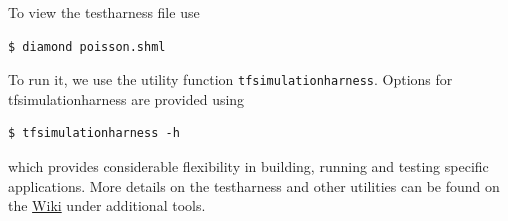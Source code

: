 To view the testharness file use
\begin{lstlisting}[style=Bash]
 $ diamond poisson.shml
\end{lstlisting} %
To run it, we use the utility function
\texttt{tfsimulationharness}.  Options for tfsimulationharness are
provided using 
\begin{lstlisting}[style=Bash]
$ tfsimulationharness -h
\end{lstlisting} %
%
%
%
which provides considerable flexibility in building, running and
testing specific applications. More details on the testharness and
other \TF{} utilities can be found on the \TF{}
\href{https://terraferma.github.io}{Wiki} under additional tools.

